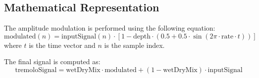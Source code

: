 \documentclass{article}
\begin{document}
\subsection{Mathematical Representation}
The amplitude modulation is performed using the following equation:
\[
\text{modulated}(n) = \text{inputSignal}(n) \cdot \left[1 - \text{depth} \cdot \left(0.5 + 0.5 \cdot \sin(2 \pi \cdot \text{rate} \cdot t)\right)\right]
\]
where \(t\) is the time vector and \(n\) is the sample index.

The final signal is computed as:
\[
\text{tremoloSignal} = \text{wetDryMix} \cdot \text{modulated} + (1 - \text{wetDryMix}) \cdot \text{inputSignal}
\]
\end{document}
